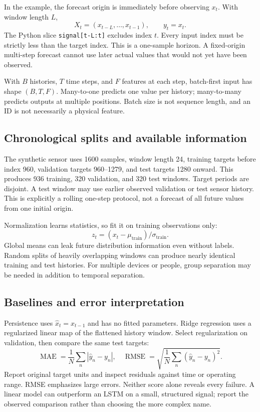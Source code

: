 In the example, the forecast origin is immediately before observing $x_t$.
With window length $L$,
\[X_t=(x_{t-L},\ldots,x_{t-1}),\qquad y_t=x_t.\]
The Python slice \texttt{signal[t-L:t]} excludes index $t$. Every input
index must be strictly less than the target index. This is a one-sample
horizon. A fixed-origin multi-step forecast cannot use later actual values
that would not yet have been observed.

With $B$ histories, $T$ time steps, and $F$ features at each step, batch-first
input has shape $(B,T,F)$. Many-to-one predicts one value per history;
many-to-many predicts outputs at multiple positions. Batch size is not
sequence length, and an ID is not necessarily a physical feature.

\subsection{Chronological splits and available information}
The synthetic sensor uses 1600 samples, window length 24, training targets
before index 960, validation targets 960--1279, and test targets 1280 onward.
This produces 936 training, 320 validation, and 320 test windows.
Target periods are disjoint. A test window may use earlier observed
validation or test sensor history. This is explicitly a rolling one-step
protocol, not a forecast of all future values from one initial origin.

Normalization learns statistics, so fit it on training observations only:
\[z_t=(x_t-\mu_{\mathrm{train}})/\sigma_{\mathrm{train}}.\]
Global means can leak future distribution information even without labels.
Random splits of heavily overlapping windows can produce nearly identical
training and test histories. For multiple devices or people, group separation
may be needed in addition to temporal separation.

\subsection{Baselines and error interpretation}
Persistence uses $\hat x_t=x_{t-1}$ and has no fitted parameters. Ridge
regression uses a regularized linear map of the flattened history window.
Select regularization on validation, then compare the same test targets:
\[
\operatorname{MAE}=\frac1N\sum_n|\hat y_n-y_n|,\quad
\operatorname{RMSE}=\sqrt{\frac1N\sum_n(\hat y_n-y_n)^2}.
\]
Report original target units and inspect residuals against time or operating
range. RMSE emphasizes large errors. Neither score alone reveals every
failure. A linear model can outperform an LSTM on a small, structured signal;
report the observed comparison rather than choosing the more complex name.

